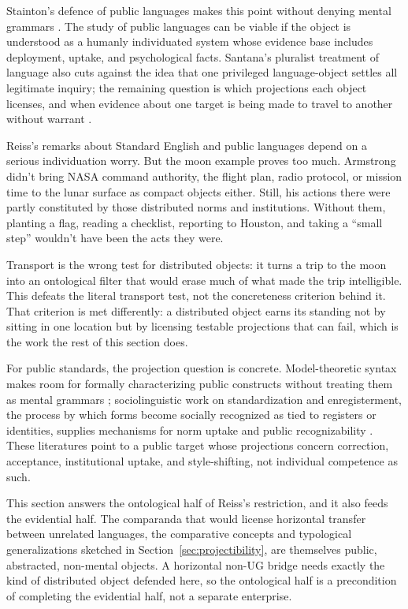\documentclass[12pt]{article}
\begin{document}
Stainton's defence of public languages makes this point without denying mental grammars \citep{stainton2011public}. The study of public languages can be viable if the object is understood as a humanly individuated system whose evidence base includes deployment, uptake, and psychological facts. Santana's pluralist treatment of language also cuts against the idea that one privileged language-object settles all legitimate inquiry; the remaining question is which projections each object licenses, and when evidence about one target is being made to travel to another without warrant \citep{santana2016language,reynolds2026whatLanguage}.

Reiss's remarks about Standard English and public languages depend on a serious individuation worry. But the moon example proves too much. Armstrong didn't bring NASA command authority, the flight plan, radio protocol, or mission time to the lunar surface as compact objects either. Still, his actions there were partly constituted by those distributed norms and institutions. Without them, planting a flag, reading a checklist, reporting to Houston, and taking a \enquote{small step} wouldn't have been the acts they were.

Transport is the wrong test for distributed objects: it turns a trip to the moon into an ontological filter that would erase much of what made the trip intelligible. This defeats the literal transport test, not the concreteness criterion behind it. That criterion is met differently: a distributed object earns its standing not by sitting in one location but by licensing testable projections that can fail, which is the work the rest of this section does.

For public standards, the projection question is concrete. Model-theoretic syntax makes room for formally characterizing public constructs without treating them as mental grammars \citep{pullum2001}; sociolinguistic work on standardization and enregisterment, the process by which forms become socially recognized as tied to registers or identities, supplies mechanisms for norm uptake and public recognizability \citep{milroy1999,agha2005}. These literatures point to a public target whose projections concern correction, acceptance, institutional uptake, and style-shifting, not individual competence as such.

This section answers the ontological half of Reiss's restriction, and it also feeds the evidential half. The comparanda that would license horizontal transfer between unrelated languages, the comparative concepts and typological generalizations sketched in Section~\ref{sec:projectibility}, are themselves public, abstracted, non-mental objects. A horizontal non-UG bridge needs exactly the kind of distributed object defended here, so the ontological half is a precondition of completing the evidential half, not a separate enterprise.
\end{document}
